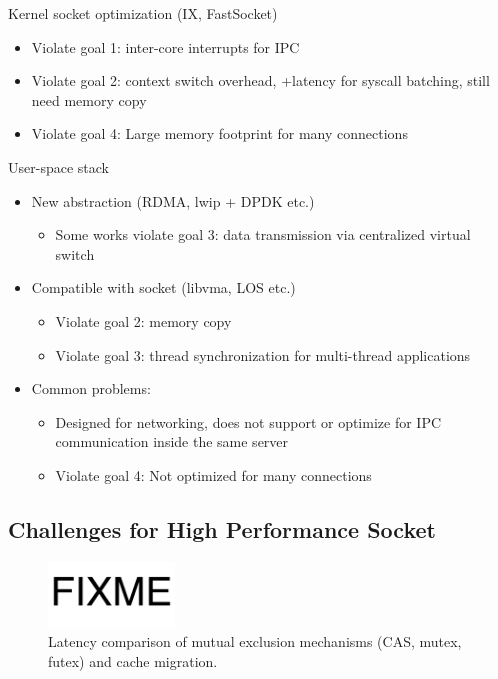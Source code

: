 Kernel socket optimization (IX, FastSocket) 

\begin{itemize}
\item
Violate goal 1: inter-core interrupts for IPC 
\item
Violate goal 2: context switch overhead, +latency for syscall batching, still need memory copy 
\item 
Violate goal 4: Large memory footprint for many connections 
\end{itemize}

User-space stack 

\begin{itemize}
\item New abstraction (RDMA, lwip + DPDK etc.) 
\begin{itemize}
	\item Some works violate goal 3: data transmission via centralized virtual switch 
\end{itemize}
\item Compatible with socket (libvma, LOS etc.) 
\begin{itemize}
	\item Violate goal 2: memory copy 
	\item Violate goal 3: thread synchronization for multi-thread applications 
\end{itemize}
\item Common problems: 
\begin{itemize}
	\item Designed for networking, does not support or optimize for IPC communication inside the same server 
	\item Violate goal 4: Not optimized for many connections 
\end{itemize}
\end{itemize}




\subsection{Challenges for High Performance Socket}
\label{subsec:challenges}

\begin{figure}[t]
	\centering
	\includegraphics[width=0.3\textwidth]{images/fixme}
	\caption{Latency comparison of mutual exclusion mechanisms (CAS, mutex, futex) and cache migration.}
	\label{fig:mutual-exclusion}
\end{figure}

